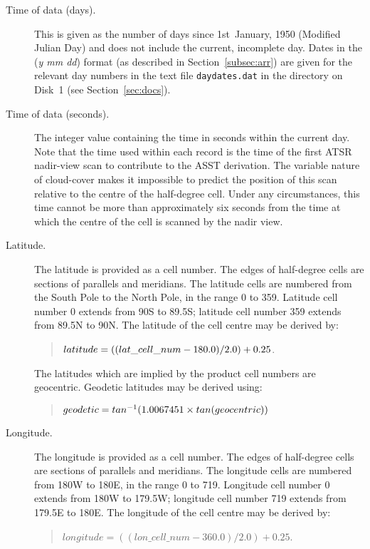 \begin{description}

\item[Time of data (days).] This is given as the 
number of days since 1st~January, 1950 (Modified Julian Day) and 
does not include the current, incomplete day.
Dates in the ({\sl y mm dd}) format (as described in 
Section~\ref{subsec:arr}) are given for the relevant day numbers 
in the text file {\tt daydates.dat} in the  directory on Disk~1 
(see Section~\ref{sec:docs}).

\item[Time of data (seconds).] The integer value containing the time in 
seconds within the current day.
Note that the time used within each record is the time of the first 
ATSR nadir-view
scan to contribute to the ASST derivation. 
The variable nature of cloud-cover makes it
impossible to predict the position of this scan relative to the centre of
the half-degree cell. Under any circumstances, this time cannot be more
than approximately six seconds from the time at which the centre of the
cell is scanned by the nadir view. 

\item[Latitude.] The latitude is provided as a cell number. The edges of
half-degree cells are sections of parallels and meridians. The latitude
cells are numbered from the South Pole to the North Pole, in the range 0 to
359. Latitude cell number 0 extends from 90{\degree}S to 89.5{\degree}S; 
latitude cell number 359 extends from 89.5{\degree}N to 
90{\degree}N. The latitude of the cell centre may be derived by:
\begin{quote} ${\sl latitude} = 
(({\sl lat}\_{\sl cell}\_{\sl num} - 180.0) / 2.0) + 0.25$.
\end{quote} 
The latitudes which are implied by the product cell numbers are
geocentric. 
Geodetic latitudes may be derived using:
\begin{quote}
$ {\sl geodetic} = tan^{-1}(1.0067451 \times tan({\sl geocentric}))$
\end{quote}

\item[Longitude.] The longitude is provided as a cell number. The edges of
half-degree cells are sections of parallels and meridians. The longitude
cells are numbered from 180{\degree}W to 180{\degree}E, in the range
0 to 719. Longitude cell number 0 extends from 180{\degree}W to 
179.5{\degree}W; longitude cell number 719 extends from 179.5{\degree}E to
180{\degree}E. The longitude of the cell centre may be derived by:
\begin{quote} $longitude = ((lon\_cell\_num - 360.0) / 2.0) + 0.25$.
\end{quote} 


\end{description}
